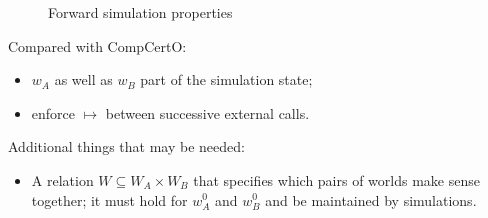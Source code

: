 \documentclass[acmsmall,screen,review,anonymous]{acmart}
\newcommand{\que}{\circ}
\newcommand{\ans}{\bullet}
\begin{document}
\begin{definition}
\begin{figure}[h]
  \caption{Forward simulation properties}
  \label{fig:fsim}
\end{figure}
\end{definition}

\noindent
Compared with CompCertO:
\begin{itemize}
  \item $w_A$ as well as $w_B$ part of the simulation state;
  \item enforce $\mapsto$ between successive external calls.
\end{itemize}
Additional things that may be needed:
\begin{itemize}
  \item A relation $W \subseteq W_A \times W_B$ that
    specifies which pairs of worlds make sense together;
    it must hold for $w_A^0$ and $w_B^0$
    and be maintained by simulations.
\end{itemize}

\end{document}
